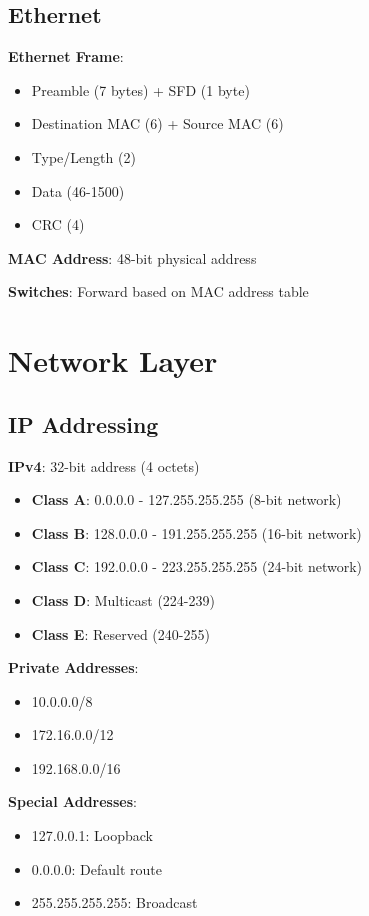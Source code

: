\documentclass[12pt,a4paper]{report}
\begin{document}
\subsection{Ethernet}
\begin{concept}
\textbf{Ethernet Frame}:
\begin{itemize}
    \item Preamble (7 bytes) + SFD (1 byte)
    \item Destination MAC (6) + Source MAC (6)
    \item Type/Length (2)
    \item Data (46-1500)
    \item CRC (4)
\end{itemize}

\textbf{MAC Address}: 48-bit physical address

\textbf{Switches}: Forward based on MAC address table
\end{concept}

\section{Network Layer}

\subsection{IP Addressing}
\begin{concept}
\textbf{IPv4}: 32-bit address (4 octets)
\begin{itemize}
    \item \textbf{Class A}: 0.0.0.0 - 127.255.255.255 (8-bit network)
    \item \textbf{Class B}: 128.0.0.0 - 191.255.255.255 (16-bit network)
    \item \textbf{Class C}: 192.0.0.0 - 223.255.255.255 (24-bit network)
    \item \textbf{Class D}: Multicast (224-239)
    \item \textbf{Class E}: Reserved (240-255)
\end{itemize}

\textbf{Private Addresses}:
\begin{itemize}
    \item 10.0.0.0/8
    \item 172.16.0.0/12
    \item 192.168.0.0/16
\end{itemize}

\textbf{Special Addresses}:
\begin{itemize}
    \item 127.0.0.1: Loopback
    \item 0.0.0.0: Default route
    \item 255.255.255.255: Broadcast
\end{itemize}
\end{concept}
\end{document}
